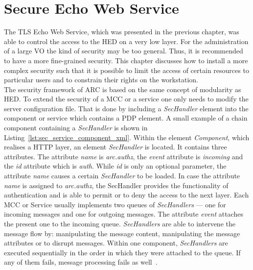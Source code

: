 \chapter{Secure Echo Web Service}

The TLS Echo Web Service, which was presented in the previous chapter, was able to control the access to the HED on a very low layer. 
For the administration of a large VO the kind of security may be too general.
Thus, it is recommended to have a more fine-grained security. 
This chapter discusses how to install a more complex security such that it is possible to limit the access of certain resources to particular users and to constrain their rights on the workstation.\\


The security framework of ARC is based on the same concept of modularity as HED. 
To extend the security of a MCC or a service one only needs to modify the server configuration file. That is done by including a \textit{SecHandler} element into the component or service which contains a PDP element. A small example of a chain component containing a \textit{SecHandler} is shown in Listing~\ref{lst:sec_service_component_xml}. Within the element \textit{Component}, which realises a HTTP layer, an element \textit{SecHandler} is located. It contains three attributes. The  attribute \textit{name} is \textit{arc.authz}, the \textit{event} attribute is \textit{incoming} and the \textit{id} attribute which is \textit{auth}. 
While \textit{id} is only an optional parameter, the attribute \textit{name} causes a certain \textit{SecHandler} to be loaded. %
In case the attribute \textit{name} is assigned to \textit{arc.authz}, the SecHandler provides the functionality of authentication and is able to permit or to deny the access to the next layer. 
Each MCC or Service usually implements two queues of \textit{SecHandlers} --- one for incoming messages and one for outgoing messages. The attribute \textit{event} attaches the present one to the incoming queue. \textit{SecHandlers} are able to intervene the message flow by: manipulating the message content, manipulating the message attributes or to disrupt messages.
Within one component, \textit{SecHandlers} are executed sequentially in the order in which they were attached to the queue. If any of them fails, message processing fails as well~\cite{QIANG_2008}.\\


